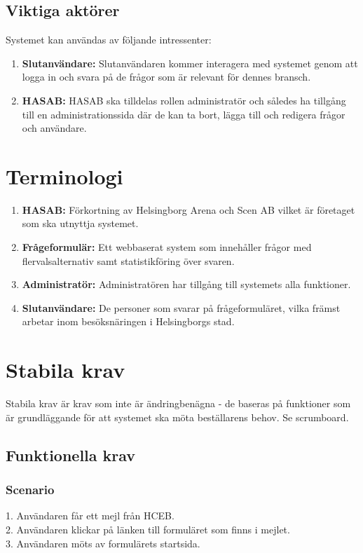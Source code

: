 \documentclass{article}
\begin{document}
    \subsection{Viktiga aktörer}
    Systemet kan användas av följande intressenter:
    \begin{enumerate}
        \item \textbf{Slutanvändare:} Slutanvändaren kommer interagera med systemet genom att logga in och svara på de frågor som är relevant för dennes bransch.
        \item \textbf{HASAB:} HASAB ska tilldelas rollen administratör och således ha tillgång till en administrationssida där de kan ta bort, lägga till och redigera frågor och användare.
    \end{enumerate}
    
    \section{Terminologi}
    \begin{enumerate}
        \item \textbf{HASAB:} Förkortning av Helsingborg Arena och Scen AB vilket är företaget som ska utnyttja systemet.
        \item \textbf{Frågeformulär:} Ett webbaserat system som innehåller frågor med flervalsalternativ samt statistikföring över svaren.
        \item \textbf{Administratör:} Administratören har tillgång till systemets alla funktioner.
        \item \textbf{Slutanvändare:}  De personer som svarar på frågeformuläret, vilka främst arbetar inom besöksnäringen i Helsingborgs stad. 
    \end{enumerate}
    
    \section{Stabila krav}
       Stabila krav är krav som inte är ändringbenägna - de baseras på funktioner som är grundläggande för att systemet ska möta beställarens behov. 
    Se scrumboard.
    
    \subsection{Funktionella krav}
    \subsubsection{Scenario}
    1. Användaren får ett mejl från HCEB. \\
    2. Användaren klickar på länken till formuläret som finns i mejlet.\\
    3. Användaren möts av formulärets startsida.\\
    
\end{document}
